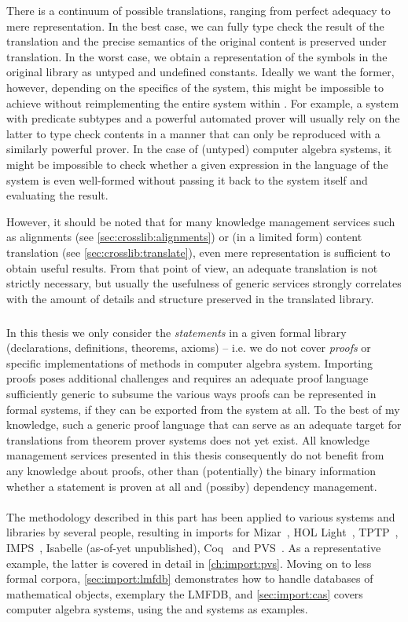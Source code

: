 There is a continuum of possible translations, ranging from perfect adequacy to mere representation. In the best case, we can fully type check the result of the translation and the precise semantics of the original content is preserved under translation. In the worst case, we obtain a representation of the symbols in the original library as untyped and undefined constants. Ideally we want the former, however, depending on the specifics of the system, this might be impossible to achieve without reimplementing the entire system within \mmt. For example, a system with predicate subtypes and a powerful automated prover will usually rely on the latter to type check contents in a manner that can only be reproduced with a similarly powerful prover. In the case of (untyped) computer algebra systems, it might be impossible to check whether a given expression in the language of the system is even well-formed without passing it back to the system itself and evaluating the result.

However, it should be noted that for many knowledge management services such as alignments (see \autoref{sec:crosslib:alignments}) or (in a limited form) content translation (see \autoref{sec:crosslib:translate}), even mere representation is sufficient to obtain useful results. From that point of view, an adequate translation is not strictly necessary, but usually the usefulness of generic services strongly correlates with the amount of details and structure preserved in the translated library.

\subparagraph{} In this thesis we only consider the \emph{statements} in a given formal library (declarations, definitions, theorems, axioms) -- i.e. we do not cover \emph{proofs} or specific implementations of methods in computer algebra system. Importing proofs poses additional challenges and requires an adequate proof language sufficiently generic to subsume the various ways proofs can be represented in formal systems, if they can be exported from the system at all. To the best of my knowledge, such a generic proof language that can serve as an adequate target for translations from theorem prover systems does not yet exist. All knowledge management services presented in this thesis consequently do not benefit from any knowledge about proofs, other than (potentially) the binary information whether a statement is proven at all and (possiby) dependency management.

\paragraph{} The methodology described in this part has been applied to various systems and libraries by several people, resulting in \ommt imports for Mizar~\cite{IKRU:mizar:11}, HOL Light~\cite{KR:hollight:14}, TPTP~\cite{tptp}, IMPS~\cite{jbetzendahl:msc18}, Isabelle (as-of-yet unpublished), Coq~\cite{coqmmt} and PVS~\cite{KohMueOwr:mpagsiuf17}. As a representative example, the latter is covered in detail in \autoref{ch:import:pvs}. Moving on to less formal corpora, \autoref{sec:import:lmfdb} demonstrates how to handle databases of mathematical objects, exemplary the LMFDB, and \autoref{sec:import:cas} covers computer algebra systems, using the \GAP and \Sage systems as examples.